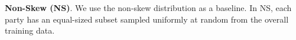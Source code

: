 \documentclass[conference]{IEEEtran}
\newcommand{\partitle}[1]{\smallskip \noindent \textbf{#1}.}
\begin{document}


\partitle{Non-Skew (NS)} We use the non-skew  distribution as a baseline. In NS, each party has an equal-sized subset sampled uniformly at random from the overall training data.  
\end{document}
